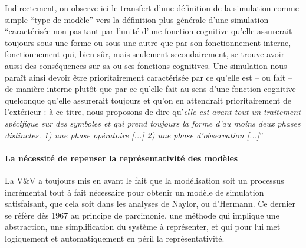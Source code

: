 Indirectement, on observe ici le transfert d'une définition de la simulation comme simple \enquote{type de modèle} vers la définition plus générale d'une simulation \enquote{caractérisée non pas tant par l’unité d’une fonction cognitive qu’elle assurerait toujours sous une forme ou sous une autre que par son fonctionnement interne, fonctionnement qui, bien sûr, mais seulement secondairement, se trouve avoir aussi des conséquences sur sa ou ses fonctions cognitives. Une simulation nous paraît ainsi devoir être prioritairement caractérisée par ce qu’elle est – ou fait – de manière interne plutôt que par ce qu’elle fait au sens d’une fonction cognitive quelconque qu’elle assurerait toujours et qu’on en attendrait prioritairement de l’extérieur : à ce titre, nous proposons de dire qu’\textit{elle est avant tout un traitement spécifique sur des symboles et qui prend toujours la forme d'au moins deux phases distinctes. 1) une phase opératoire [...] 2) une phase d'observation [...]}} \autocite[33-34]{Varenne2013}

\paragraph{La nécessité de repenser la représentativité des modèles}
\label{p:repenser la representativite}

La V\&V a toujours mis en avant le fait que la modélisation soit un processus incrémental tout à fait nécessaire pour obtenir un modèle de simulation satisfaisant, que cela soit dans les analyses de Naylor, ou d'Hermann. Ce dernier se réfère dès 1967 au principe de parcimonie, une méthode qui implique une abstraction, une simplification du système à représenter, et qui pour lui met logiquement et automatiquement en péril la représentativité. 



